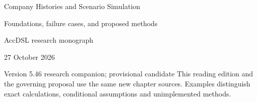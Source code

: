 \documentclass[11pt,a4paper]{report}
\begin{document}
\hypersetup{pageanchor=false}
\begin{titlepage}
{\Huge Company Histories and Scenario Simulation\par}
\vspace{12mm}
{\Large Foundations, failure cases, and proposed methods\par}
\vspace{8mm}
AccDSL research monograph\par 27 October 2026\par Version 5.46 research companion; provisional candidate
\vfill
This reading edition and the governing proposal use the same new chapter sources. Examples distinguish exact calculations, conditional assumptions and unimplemented methods.
\end{titlepage}
\hypersetup{pageanchor=true}
\tableofcontents
\clearpage{}


























\clearpage\label{sim:body-end}

\begingroup\raggedright
\endgroup
\end{document}
